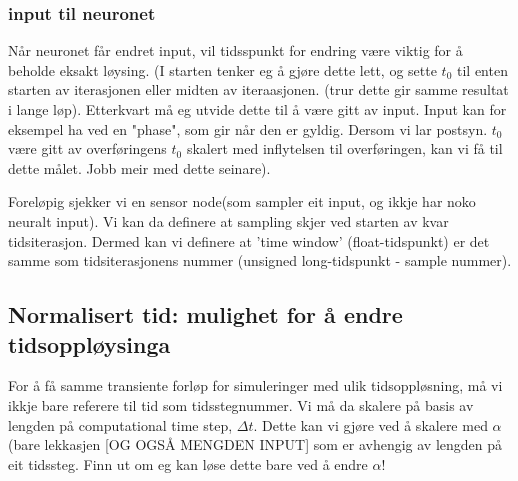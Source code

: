 		\subsubsection{input til neuronet}
			Når neuronet får endret input, vil tidsspunkt for endring være viktig for å beholde eksakt løysing.
			(I starten tenker eg å gjøre dette lett, og sette $t_0$ til enten starten av iterasjonen eller midten av iteraasjonen. (trur dette gir samme resultat i lange løp). 
				Etterkvart må eg utvide dette til å være gitt av input. Input kan for eksempel ha ved en "phase", som gir når den er gyldig. 
				Dersom vi lar postsyn. $t_0$ være gitt av overføringens $t_0$ skalert med inflytelsen til overføringen, kan vi få til dette målet. Jobb meir med dette seinare).

		Foreløpig sjekker vi en sensor node(som sampler eit input, og ikkje har noko neuralt input).
		Vi kan da definere at sampling skjer ved starten av kvar tidsiterasjon.
		Dermed kan vi definere at 'time window' (float-tidspunkt) er det samme som tidsiterasjonens nummer (unsigned long-tidspunkt - sample nummer).


	\subsection{Normalisert tid: mulighet for å endre tidsoppløysinga}
	For å få samme transiente forløp for simuleringer med ulik tidsoppløsning, må vi ikkje bare referere til tid som tidsstegnummer. 
	Vi må da skalere på basis av lengden på computational time step, $\Delta t$.
	Dette kan vi gjøre ved å skalere med $\alpha$ (bare lekkasjen [OG OGSÅ MENGDEN INPUT] som er avhengig av lengden på eit tidssteg.
	Finn ut om eg kan løse dette bare ved å endre $\alpha$!

